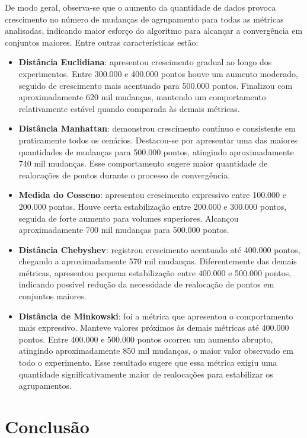 \documentclass[10pt,a4paper,twocolumn]{article}
\begin{document}
De modo geral, observa-se que o aumento da quantidade de dados provoca crescimento no número de mudanças de agrupamento para todas as métricas analisadas, indicando maior esforço do algoritmo para alcançar a convergência em conjuntos maiores. Entre outras características estão:

\begin{itemize}
    \item \textbf{Distância Euclidiana}: apresentou crescimento gradual ao longo dos experimentos. Entre 300.000 e 400.000 pontos houve um aumento moderado, seguido de crescimento mais acentuado para 500.000 pontos. Finalizou com aproximadamente 620 mil mudanças, mantendo um comportamento relativamente estável quando comparada às demais métricas.

    \item \textbf{Distância Manhattan}: demonstrou crescimento contínuo e consistente em praticamente todos os cenários. Destacou-se por apresentar uma das maiores quantidades de mudanças para 500.000 pontos, atingindo aproximadamente 740 mil mudanças. Esse comportamento sugere maior quantidade de realocações de pontos durante o processo de convergência.

    \item \textbf{Medida do Cosseno}: apresentou crescimento expressivo entre 100.000 e 200.000 pontos. Houve certa estabilização entre 200.000 e 300.000 pontos, seguida de forte aumento para volumes superiores. Alcançou aproximadamente 700 mil mudanças para 500.000 pontos.

    \item \textbf{Distância Chebyshev}: registrou crescimento acentuado até 400.000 pontos, chegando a aproximadamente 570 mil mudanças. Diferentemente das demais métricas, apresentou pequena estabilização entre 400.000 e 500.000 pontos, indicando possível redução da necessidade de realocação de pontos em conjuntos maiores.

    \item \textbf{Distância de Minkowski}: foi a métrica que apresentou o comportamento mais expressivo. Manteve valores próximos às demais métricas até 400.000 pontos. Entre 400.000 e 500.000 pontos ocorreu um aumento abrupto, atingindo aproximadamente 850 mil mudanças, o maior valor observado em todo o experimento. Esse resultado sugere que essa métrica exigiu uma quantidade significativamente maior de realocações para estabilizar os agrupamentos.
\end{itemize}


\section{Conclusão}
\end{document}
